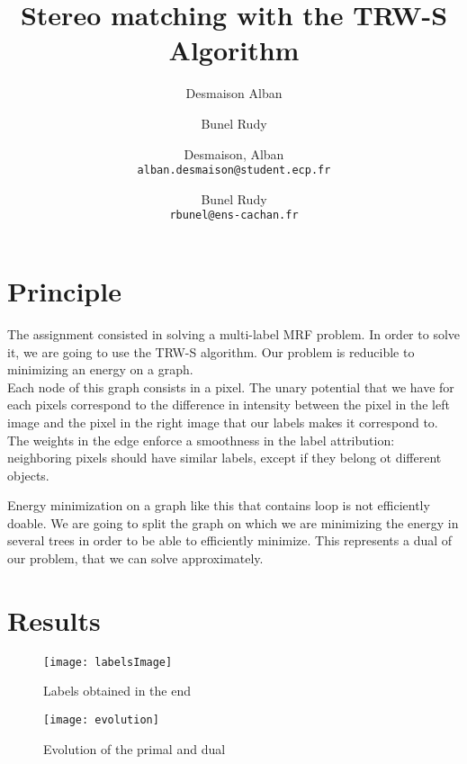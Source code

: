 \documentclass [11pt]{article}
\title{Stereo matching with the TRW-S Algorithm}
\author{Desmaison Alban \and Bunel Rudy}
\author{
  Desmaison, Alban\\
  \texttt{alban.desmaison@student.ecp.fr}
  \and
  Bunel Rudy\\
  \texttt{rbunel@ens-cachan.fr}
}
\begin{document}
\maketitle


\section{Principle}
The assignment consisted in solving a multi-label MRF problem. In order to solve it, we are going to use the TRW-S algorithm. Our problem is reducible to minimizing an energy on a graph.\\

Each node of this graph consists in a pixel. The unary potential that we have for each pixels correspond to the difference in intensity between the pixel in the left image and the pixel in the right image that our labels makes it correspond to. The weights in the edge enforce a smoothness in the label attribution: neighboring pixels should have similar labels, except if they belong ot different objects.


Energy minimization on a graph like this that contains loop is not efficiently doable. We are going to split the graph on which we are minimizing the energy in several trees in order to be able to efficiently minimize. This represents a dual of our problem, that we can solve approximately.

\section{Results}

\begin{figure}[htbp]
  \centering
  \texttt{[image: labelsImage]}
  \caption{Labels obtained in the end}
  \label{fig:labels}
\end{figure}

\begin{figure}[htbp]
  \centering
  \texttt{[image: evolution]}
  \caption{Evolution of the primal and dual}
  \label{fig:evolution}
\end{figure}
\end{document}
